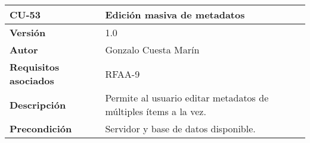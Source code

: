 \begin{longtable}[]{@{}ll@{}}
\toprule
\begin{minipage}[b]{0.15\columnwidth}\raggedright
\textbf{CU-53}\strut
\end{minipage} & \begin{minipage}[b]{0.79\columnwidth}\raggedright
\textbf{Edición masiva de metadatos}\strut
\end{minipage}\tabularnewline
\midrule
\endhead
\begin{minipage}[t]{0.15\columnwidth}\raggedright
\textbf{Versión}\strut
\end{minipage} & \begin{minipage}[t]{0.79\columnwidth}\raggedright
1.0\strut
\end{minipage}\tabularnewline
\begin{minipage}[t]{0.15\columnwidth}\raggedright
\textbf{Autor}\strut
\end{minipage} & \begin{minipage}[t]{0.79\columnwidth}\raggedright
Gonzalo Cuesta Marín\strut
\end{minipage}\tabularnewline
\begin{minipage}[t]{0.15\columnwidth}\raggedright
\textbf{Requisitos asociados}\strut
\end{minipage} & \begin{minipage}[t]{0.79\columnwidth}\raggedright
RFAA-9\strut
\end{minipage}\tabularnewline
\begin{minipage}[t]{0.15\columnwidth}\raggedright
\textbf{Descripción}\strut
\end{minipage} & \begin{minipage}[t]{0.79\columnwidth}\raggedright
Permite al usuario editar metadatos de múltiples ítems a la vez.\strut
\end{minipage}\tabularnewline
\begin{minipage}[t]{0.15\columnwidth}\raggedright
\textbf{Precondición}\strut
\end{minipage} & \begin{minipage}[t]{0.79\columnwidth}\raggedright
Servidor y base de datos disponible.


\end{minipage}
\end{longtable}
